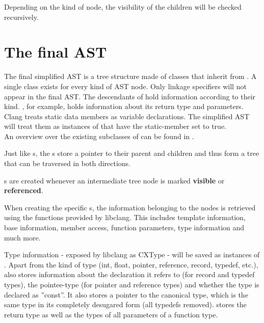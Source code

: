 Depending on the kind of node, the visibility of the children will be checked recursively.


\section{The final AST}

The final simplified AST is a tree structure made of classes that inherit from
. A single class exists for every kind of AST node. Only linkage specifiers will not appear in the final AST. The descendants of  hold information according to their kind. , for example, holds information about its return type and parameters. Clang treats static data members as variable declarations. The simplified AST will treat them as instances of  that have the static-member set to true.\\
An overview over the existing subclasses of  can be found in .


Just like s, the s store a pointer to their parent and children and thus form a tree that can be traversed in both directions.

s are created whenever an intermediate tree node is marked \textbf{visible} or \textbf{referenced}.

When creating the specific s, the information belonging to the nodes is retrieved using the functions provided by libclang. This includes template information, base information, member access, function parameters, type information and much more.

Type information - exposed by libclang as CXType - will be saved as instances of . Apart from the kind of type (int, float, pointer, reference, record, typedef, etc.),  also stores information about the declaration  it refers to (for record and typedef types), the pointee-type (for pointer and reference types) and whether the type is declared as ''const''. It also stores a pointer to the canonical type, which is the same type in its completely desugared form (all typedefs removed).  stores the return type as well as the types of all parameters of a function type.

